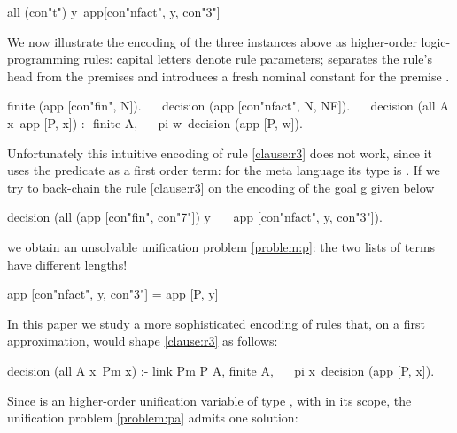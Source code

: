 \documentclass[sigconf,natbib=false,review]{acmart}
\begin{document}
\begin{elpicode}
all (con"t") y\ app[con"nfact", y, con"3"]
\end{elpicode}

\noindent
We now illustrate the encoding of the three instances above as higher-order
logic-programming rules: capital letters denote rule
parameters; \elpiIn{:-} separates the rule's head from the premises and
 introduces a fresh nominal constant 
for the premise .

\begin{elpicode}
finite   (app [con"fin", N]).                         ~~
decision (app [con"nfact", N, NF]).                   ~~
decision (all A x\ app [P, x]) :- finite A,           ~~
  pi w\ decision (app [P, w]).
\end{elpicode}

\noindent
Unfortunately this intuitive encoding of rule \ref{clause:r3} does not work,
since it uses the predicate  as a first order term: for the meta
language its type is . If we try to back-chain the rule
\ref{clause:r3} on the encoding of the goal g given below

\begin{elpicode}
decision (all (app [con"fin", con"7"]) y\              ~~
  app [con"nfact", y, con"3"]).
\end{elpicode}

\noindent
we obtain an unsolvable unification problem \ref{problem:p}:
the two lists of terms have different lengths!

\begin{elpicode}
app [con"nfact", y, con"3"] = app [P, y]               ~~
\end{elpicode}

\noindent
In this paper we study a more sophisticated encoding of rules that, on a first
approximation, would shape \ref{clause:r3} as follows:

\begin{elpicode}
decision (all A x\ Pm x) :- link Pm P A, finite A,    ~~
  pi x\ decision (app [P, x]).
\end{elpicode}

\noindent
Since  is an higher-order unification variable
of type ,
with 
in its scope, the unification problem \ref{problem:pa}
admits one solution:
\end{document}
